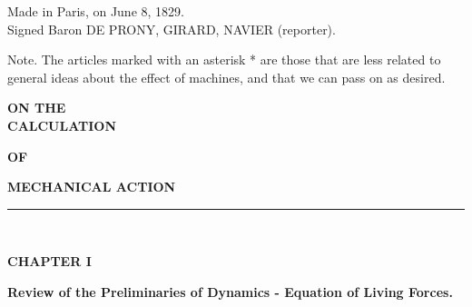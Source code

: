 \documentclass{book}
\begin{document}
\begin{flushright}

 Made in Paris, on June 8, 1829. 
\\
Signed Baron DE PRONY, GIRARD, NAVIER (reporter).
\end{flushright}



\tableofcontents



\vfill
Note. The articles marked with an asterisk * are those that are less related to general ideas about the effect of machines, and that we can pass on as desired.

\clearpage %



\mainmatter
\pagestyle{fancy} %
\newpage  %

\begin{center}
\large\textbf{ON THE}\\
\vspace{3mm}
\huge\textbf{CALCULATION}\\ 
\vspace{3mm}

\large\textbf{OF} \\ 
\vspace{3mm}

\huge\textbf{MECHANICAL ACTION}
\end{center}
\vspace{3mm}

\par\noindent\rule{\textwidth}{2pt}\\

\vspace{5mm}

\begin{center}
\huge\bfseries CHAPTER I
\end{center}
\vspace{10mm} %


\textbf{Review of the Preliminaries of Dynamics - Equation of Living Forces.}
\end{document}
